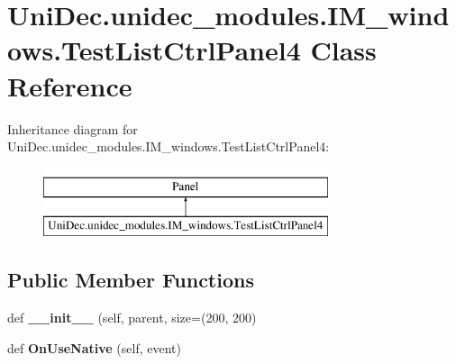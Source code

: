 \hypertarget{class_uni_dec_1_1unidec__modules_1_1_i_m__windows_1_1_test_list_ctrl_panel4}{}\section{Uni\+Dec.\+unidec\+\_\+modules.\+I\+M\+\_\+windows.\+Test\+List\+Ctrl\+Panel4 Class Reference}
\label{class_uni_dec_1_1unidec__modules_1_1_i_m__windows_1_1_test_list_ctrl_panel4}
Inheritance diagram for Uni\+Dec.\+unidec\+\_\+modules.\+I\+M\+\_\+windows.\+Test\+List\+Ctrl\+Panel4\+:\begin{figure}[H]
\begin{center}
\leavevmode
\includegraphics[height=2.000000cm]{class_uni_dec_1_1unidec__modules_1_1_i_m__windows_1_1_test_list_ctrl_panel4}
\end{center}
\end{figure}
\subsection*{Public Member Functions}
\begin{DoxyCompactItemize}
\item 
\hypertarget{class_uni_dec_1_1unidec__modules_1_1_i_m__windows_1_1_test_list_ctrl_panel4_a9619d9cca958961303458698e3d29fc1}{}def {\bfseries \+\_\+\+\_\+init\+\_\+\+\_\+} (self, parent, size=(200, 200)\label{class_uni_dec_1_1unidec__modules_1_1_i_m__windows_1_1_test_list_ctrl_panel4_a9619d9cca958961303458698e3d29fc1}

\item 
\hypertarget{class_uni_dec_1_1unidec__modules_1_1_i_m__windows_1_1_test_list_ctrl_panel4_a0ee5329a7ae226b86c32e568de42e6ab}{}def {\bfseries On\+Use\+Native} (self, event)\label{class_uni_dec_1_1unidec__modules_1_1_i_m__windows_1_1_test_list_ctrl_panel4_a0ee5329a7ae226b86c32e568de42e6ab}

\end{DoxyCompactItemize}
